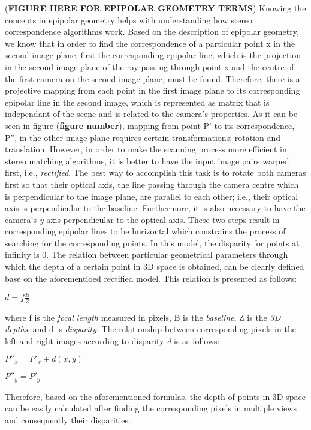 \documentclass[dvips,letterpaper,12pt]{report}
\begin{document}
(\textbf{FIGURE HERE FOR EPIPOLAR GEOMETRY TERMS}) 
\newline 
Knowing the concepts in epipolar geometry helps with understanding how stereo correspondence algorithms work. Based on the description of epipolar geometry, 
we know that in order to find the correspondence of a particular point x in the second image plane, first the corresponding epipolar line, which is the projection in the second image plane 
of the ray passing through point x and the centre of the first camera on the second image plane, must be found. Therefore, there is a projective mapping from each point in the first image plane 
to its corresponding epipolar line in the second image, which is represented as matrix that is independant of the scene and is related to the camera's properties.\cite{hart2000} As it can be
seen in figure (\textbf{figure number}), mapping from point P' to its correspondence, P'', in the other image plane requires certain transformations; rotation and translation. However, in order
to make the scanning process more efficient in stereo matching algorithms, it is better to have the input image pairs warped first, i.e., {\it rectified}. The best way to accomplish this task is to
rotate both cameras first so that their optical axis, the line passing through the camera centre which is perpendicular to the image plane, are parallel to each other; 
i.e., their optical axis is perpendicular to the baseline. Furthermore, it is also necessary to have the camera's {\it y} axis perpendicular to the optical axis. These two steps result
in corresponding epipolar lines to be horizontal which constrains the process of searching for the corresponding points. In this model, the disparity for points at infinity is 0.\cite{sze11}
The relation between particular geometrical parameters through which the depth of a certain point in 3D space is obtained, can be clearly defined base on the aforementioed rectified model. 
This relation is presented as follows:
\begin{center}
$d = f\frac{B}{Z}$
\end{center}
where f is the {\it focal length} measured in pixels, B is the {\it baseline}, Z is the {\it 3D depths}, and d is {\it disparity}. The relationship between corresponding pixels in the left
and right images according to disparity {\it d} is as follows:
\begin{center}
${P}''_{x}={P}'_{x}+d(x,y)$

${P}''_{y} = {P}'_{y}$
\end{center}
Therefore, based on the aforementioned formulas, the depth of points in 3D space can be easily calculated after finding the corresponding pixels in multiple views and consequently their
disparities. \cite{bol87,oku93,sch02}
\end{document}
